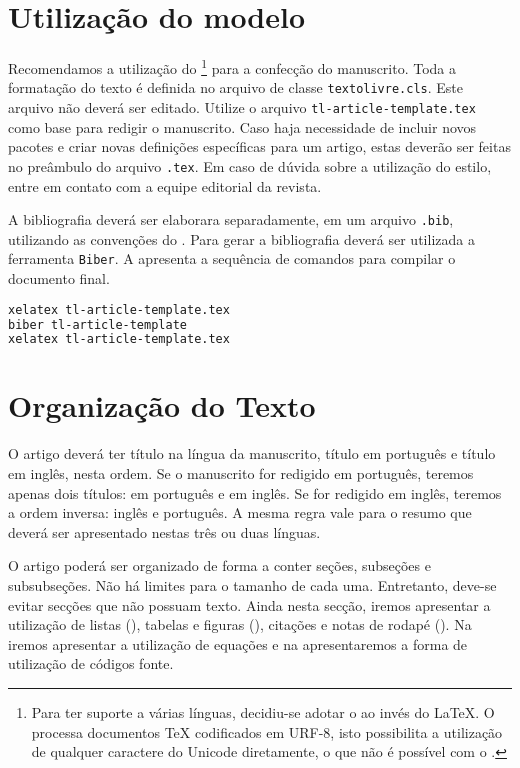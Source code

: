\documentclass{textolivre}
\begin{document}
\section{Utilização do modelo}\label{sec-modelo}
Recomendamos a utilização do \footnote{
Para ter suporte a várias línguas, decidiu-se adotar o  ao invés do \LaTeX{}.
O  processa documentos \TeX{} codificados em URF-8, isto possibilita 
a utilização de qualquer caractere do Unicode diretamente, o que não é possível com o .  
} para a confecção do manuscrito.
Toda a formatação do texto é definida no arquivo de classe \texttt{textolivre.cls}. 
Este arquivo não deverá ser editado. 
Utilize o arquivo \texttt{tl-article-template.tex} como base para redigir o manuscrito.
Caso haja necessidade de incluir novos pacotes e criar novas definições específicas para um artigo, 
estas deverão ser feitas no preâmbulo do arquivo \texttt{.tex}. 
Em caso de dúvida sobre a utilização do estilo, entre em contato com a equipe editorial da revista.

A bibliografia deverá ser elaborara separadamente, em um arquivo \texttt{.bib}, utilizando as 
convenções do . Para gerar a bibliografia deverá ser utilizada a ferramenta \texttt{Biber}.
A  apresenta a sequência de comandos para compilar o documento final.
\begin{lstlisting}[language=bash, label=lst-compiledocument, caption={Sequência para gerar o documento final.}]
xelatex tl-article-template.tex 
biber tl-article-template 
xelatex tl-article-template.tex
\end{lstlisting} %

\section{Organização do Texto}\label{sec-organizacao}
O artigo deverá ter título na língua da manuscrito, título em português e título em inglês, nesta ordem.
Se o manuscrito for redigido em português, teremos apenas dois títulos: em português e em inglês.
Se for redigido em inglês, teremos a ordem inversa: inglês e português.
A mesma regra vale para o resumo que deverá ser apresentado nestas três ou duas línguas.

O artigo poderá ser organizado de forma a conter seções, subseções e subsubseções. 
Não há limites para o tamanho de cada uma. Entretanto, deve-se evitar secções que não possuam texto. 
Ainda nesta secção, iremos apresentar a utilização de listas (), 
tabelas e figuras (), citações e notas de rodapé (). 
Na  iremos apresentar a utilização de equações e na 
apresentaremos a forma de utilização de códigos fonte.
\end{document}
